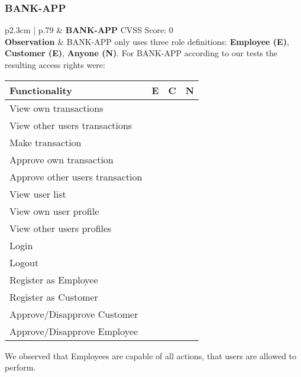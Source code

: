 \subsubsection{BANK-APP}
\begin{longtable}[l]{ p{2.3cm} | p{.79\linewidth} }\hline
    & \textbf{BANK-APP}
    \hfill CVSS Score: 0 
    \\ \hline
    \textbf{Observation} &
    	BANK-APP only uses three role definitions: \textbf{Employee (E)}, \textbf{Customer (E)}, \textbf{Anyone (N)}.
		For BANK-APP according to our tests the resulting access rights were:
		\begin{center}
		    \begin{tabular}{ | l | l | l | l |}
		    \hline
		    \textbf{Functionality} 			& \textbf{E} & \textbf{C} & \textbf{N} \\ \hline
		    View own transactions 			& \cmark  	& \cmark 	& \xmark \\ \hline
		    View other users transactions 	& \cmark 	& \xmark	& \xmark \\ \hline
		    Make transaction 				& \cmark 	& \cmark 	& \xmark \\ \hline
		    Approve own transaction 		& \cmark 	& \xmark 	& \xmark \\ \hline
		    Approve other users transaction & \cmark 	& \xmark 	& \xmark \\ \hline
		    View user list 					& \cmark 	& \xmark 	& \xmark \\ \hline
		    View own user profile 			& \cmark 	& \cmark 	& \xmark \\ \hline
		    View other users profiles 		& \cmark 	& \xmark 	& \xmark \\ \hline
		    Login 							& \cmark 	& \cmark 	& \xmark \\ \hline
		    Logout 							& \cmark 	& \cmark 	& \xmark \\ \hline
		    Register as Employee 			& \cmark 	& \cmark 	& \cmark \\ \hline
		    Register as Customer 			& \cmark 	& \cmark 	& \cmark \\ \hline
		    Approve/Disapprove Customer 	& \cmark 	& \xmark 	& \xmark \\ \hline
		    Approve/Disapprove Employee 	& \cmark 	& \xmark 	& \xmark \\ \hline
		    \end{tabular}
		\end{center}
		We observed that Employees are capable of all actions, that users are allowed to perform.

\end{longtable}
